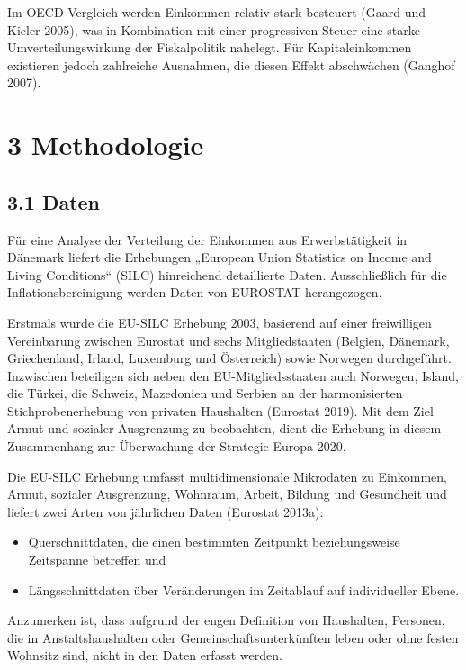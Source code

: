 \documentclass[ngerman,]{article}
\providecommand{\tightlist}{%
  \setlength{\itemsep}{0pt}\setlength{\parskip}{0pt}}
\begin{document}
Im OECD-Vergleich werden Einkommen relativ stark besteuert (Gaard und
Kieler 2005), was in Kombination mit einer progressiven Steuer eine
starke Umverteilungswirkung der Fiskalpolitik nahelegt. Für
Kapitaleinkommen existieren jedoch zahlreiche Ausnahmen, die diesen
Effekt abschwächen (Ganghof 2007).

\section{3 Methodologie}\label{methodologie}

\subsection{3.1 Daten}\label{daten}

Für eine Analyse der Verteilung der Einkommen aus Erwerbstätigkeit in
Dänemark liefert die Erhebungen „European Union Statistics on Income and
Living Conditions`` (SILC) hinreichend detaillierte Daten.
Ausschließlich für die Inflationsbereinigung werden Daten von EUROSTAT
herangezogen.

Erstmals wurde die EU-SILC Erhebung 2003, basierend auf einer
freiwilligen Vereinbarung zwischen Eurostat und sechs Mitgliedstaaten
(Belgien, Dänemark, Griechenland, Irland, Luxemburg und Österreich)
sowie Norwegen durchgeführt. Inzwischen beteiligen sich neben den
EU-Mitgliedsstaaten auch Norwegen, Island, die Türkei, die Schweiz,
Mazedonien und Serbien an der harmonisierten Stichprobenerhebung von
privaten Haushalten (Eurostat 2019). Mit dem Ziel Armut und sozialer
Ausgrenzung zu beobachten, dient die Erhebung in diesem Zusammenhang zur
Überwachung der Strategie Europa 2020.

Die EU-SILC Erhebung umfasst multidimensionale Mikrodaten zu Einkommen,
Armut, sozialer Ausgrenzung, Wohnraum, Arbeit, Bildung und Gesundheit
und liefert zwei Arten von jährlichen Daten (Eurostat 2013a):

\begin{itemize}
\tightlist
\item
  Querschnittdaten, die einen bestimmten Zeitpunkt beziehungsweise
  Zeitspanne betreffen und
\item
  Längsschnittdaten über Veränderungen im Zeitablauf auf individueller
  Ebene.
\end{itemize}

Anzumerken ist, dass aufgrund der engen Definition von Haushalten,
Personen, die in Anstaltshaushalten oder Gemeinschaftsunterkünften leben
oder ohne festen Wohnsitz sind, nicht in den Daten erfasst werden.
\end{document}
